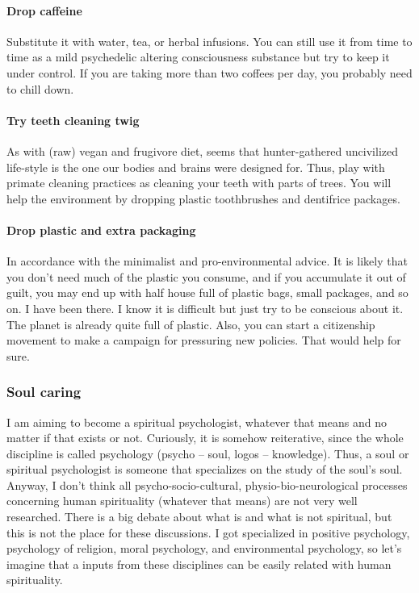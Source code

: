\documentclass{article}
\begin{document}
\paragraph{Drop caffeine}
Substitute it with water, tea, or herbal infusions. You can still use it from time to time as a mild psychedelic altering consciousness substance but try to keep it under control. If you are taking more than two coffees per day, you probably need to chill down. 
\paragraph{Try teeth cleaning twig}
As with (raw) vegan and frugivore diet, seems that hunter-gathered uncivilized life-style is the one our bodies and brains were designed for. Thus, play with primate cleaning practices as cleaning your teeth with parts of trees. You will help the environment by dropping plastic toothbrushes and dentifrice packages. 
\paragraph{Drop plastic and extra packaging}
In accordance with the minimalist and pro-environmental advice. It is likely that you don’t need much of the plastic you consume, and if you accumulate it out of guilt, you may end up with half house full of plastic bags, small packages, and so on. I have been there. I know it is difficult but just try to be conscious about it. The planet is already quite full of plastic. Also, you can start a citizenship movement to make a campaign for pressuring new policies. That would help for sure. 

\subsubsection{Soul caring}
\label{subsubsec: Soul}
I am aiming to become a spiritual psychologist, whatever that means and no matter if that exists or not. Curiously, it is somehow reiterative, since the whole discipline is called psychology (psycho – soul, logos – knowledge). Thus, a soul or spiritual psychologist is someone that specializes on the study of the soul’s soul. Anyway, I don’t think all psycho-socio-cultural, physio-bio-neurological processes concerning human spirituality (whatever that means) are not very well researched. There is a big debate about what is and what is not spiritual, but this is not the place for these discussions. I got specialized in positive psychology, psychology of religion, moral psychology, and environmental psychology, so let’s imagine that a inputs from these disciplines can be easily related with human spirituality. 
\end{document}
